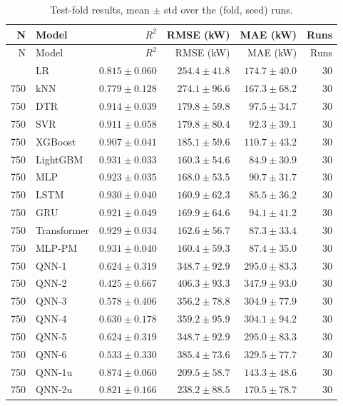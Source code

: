 \begin{longtable}{rlrrrr}
\caption{Test-fold results, mean $\pm$ std over the (fold, seed) runs.}\label{tab:t3} \\
\toprule
N & Model & $R^2$ & RMSE (kW) & MAE (kW) & Runs \\
\midrule
\endfirsthead
\toprule
N & Model & $R^2$ & RMSE (kW) & MAE (kW) & Runs \\
\midrule
\endhead
\bottomrule
\endlastfoot
750 & LR & $0.815 \pm 0.060$ & $254.4 \pm 41.8$ & $174.7 \pm 40.0$ & 30 \\
750 & kNN & $0.779 \pm 0.128$ & $274.1 \pm 96.6$ & $167.3 \pm 68.2$ & 30 \\
750 & DTR & $0.914 \pm 0.039$ & $179.8 \pm 59.8$ & $97.5 \pm 34.7$ & 30 \\
750 & SVR & $0.911 \pm 0.058$ & $179.8 \pm 80.4$ & $92.3 \pm 39.1$ & 30 \\
750 & XGBoost & $0.907 \pm 0.041$ & $185.1 \pm 59.6$ & $110.7 \pm 43.2$ & 30 \\
750 & LightGBM & $0.931 \pm 0.033$ & $160.3 \pm 54.6$ & $84.9 \pm 30.9$ & 30 \\
750 & MLP & $0.923 \pm 0.035$ & $168.0 \pm 53.5$ & $90.7 \pm 31.7$ & 30 \\
750 & LSTM & $0.930 \pm 0.040$ & $160.9 \pm 62.3$ & $85.5 \pm 36.2$ & 30 \\
750 & GRU & $0.921 \pm 0.049$ & $169.9 \pm 64.6$ & $94.1 \pm 41.2$ & 30 \\
750 & Transformer & $0.929 \pm 0.034$ & $162.6 \pm 56.7$ & $87.3 \pm 33.4$ & 30 \\
750 & MLP-PM & $0.931 \pm 0.040$ & $160.4 \pm 59.3$ & $87.4 \pm 35.0$ & 30 \\
750 & QNN-1 & $0.624 \pm 0.319$ & $348.7 \pm 92.9$ & $295.0 \pm 83.3$ & 30 \\
750 & QNN-2 & $0.425 \pm 0.667$ & $406.3 \pm 93.3$ & $347.9 \pm 93.0$ & 30 \\
750 & QNN-3 & $0.578 \pm 0.406$ & $356.2 \pm 78.8$ & $304.9 \pm 77.9$ & 30 \\
750 & QNN-4 & $0.630 \pm 0.178$ & $359.2 \pm 95.9$ & $304.1 \pm 94.2$ & 30 \\
750 & QNN-5 & $0.624 \pm 0.319$ & $348.7 \pm 92.9$ & $295.0 \pm 83.3$ & 30 \\
750 & QNN-6 & $0.533 \pm 0.330$ & $385.4 \pm 73.6$ & $329.5 \pm 77.7$ & 30 \\
750 & QNN-1u & $0.874 \pm 0.060$ & $209.5 \pm 58.7$ & $143.3 \pm 48.6$ & 30 \\
750 & QNN-2u & $0.821 \pm 0.166$ & $238.2 \pm 88.5$ & $170.5 \pm 78.7$ & 30 \\

\end{longtable}
